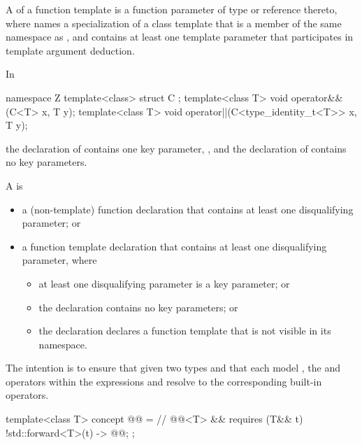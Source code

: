 \pnum
{}%
A  of a function template 
is a function parameter of type \cv{}  or reference thereto,
where  names a specialization of a class template that
is a member of the same namespace as , and
 contains at least one template parameter that
participates in template argument deduction.
\begin{example}
In
\begin{codeblock}
namespace Z {
  template<class> struct C {};
  template<class T>
    void operator&&(C<T> x, T y);
  template<class T>
    void operator||(C<type_identity_t<T>> x, T y);
}
\end{codeblock}
the declaration of 
contains one key parameter, , and
the declaration of 
contains no key parameters.
\end{example}

\pnum
A  is

\begin{itemize}
\item
a (non-template) function declaration that
contains at least one disqualifying parameter; or

\item
a function template declaration that
contains at least one disqualifying parameter, where
\begin{itemize}
\item at least one disqualifying parameter is a key parameter; or
\item the declaration contains no key parameters; or
\item the declaration declares a function template that
is not visible in its namespace.
\end{itemize}
\end{itemize}

\pnum
\begin{note}
The intention is to ensure that
given two types  and 
that each model ,
the \tcode{\&\&} and \tcode{||} operators within the expressions
 and
resolve to the corresponding built-in operators.
\end{note}

\begin{itemdecl}
template<class T>
  concept @@ =                // \expos
    @@<T> && requires (T&& t) {
      { !std::forward<T>(t) } -> @@;
    };
\end{itemdecl}

